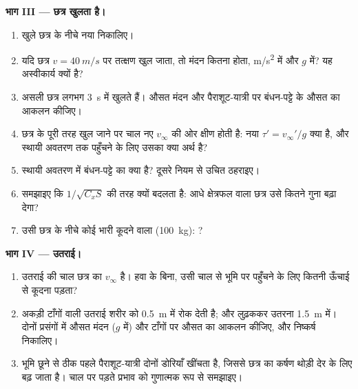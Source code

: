 \begin{problem}
\medskip
\noindent\textbf{भाग III --- छत्र खुलता है।}
\begin{enumerate}[resume]
  \item खुले छत्र के नीचे नया  निकालिए।
  \item यदि छत्र $v = \qty{40}{m/s}$ पर तत्क्षण खुल जाता, तो मंदन कितना
        होता, \unit{m/s^2} में और $g$ में? यह अस्वीकार्य क्यों है?
  \item असली छत्र लगभग \qty{3}{s} में खुलते हैं। औसत मंदन और
        पैराशूट-यात्री पर बंधन-पट्टे के औसत  का आकलन कीजिए।
  \item छत्र के पूरी तरह खुल जाने पर चाल नए $v_\infty$ की ओर क्षीण होती है:
        नया  $\tau' = v_\infty'/g$ क्या है, और स्थायी अवतरण तक
        पहुँचने के लिए उसका क्या अर्थ है?
  \item स्थायी अवतरण में बंधन-पट्टे का  क्या है? दूसरे नियम से उचित
        ठहराइए।
  \item समझाइए कि  $1/\sqrt{C_xS}$ की तरह क्यों बदलता है: आधे
        क्षेत्रफल वाला छत्र उसे कितने गुना बढ़ा देगा?
  \item उसी छत्र के नीचे कोई भारी कूदने वाला (\qty{100}{kg}): ?
\end{enumerate}

\medskip
\noindent\textbf{भाग IV --- उतराई।}
\begin{enumerate}[resume]
  \item उतराई की चाल छत्र का $v_\infty$ है। हवा के बिना, उसी चाल से भूमि
        पर पहुँचने के लिए कितनी ऊँचाई से कूदना पड़ता?
  \item अकड़ी टाँगों वाली उतराई शरीर को \qty{0.5}{m} में रोक देती है; और
        लुढ़ककर उतरना \qty{1.5}{m} में। दोनों प्रसंगों में औसत मंदन ($g$ में)
        और टाँगों पर औसत  का आकलन कीजिए, और निष्कर्ष निकालिए।
  \item भूमि छूने से ठीक पहले पैराशूट-यात्री दोनों डोरियाँ खींचता है, जिससे
        छत्र का कर्षण थोड़ी देर के लिए बढ़ जाता है। चाल पर पड़ते प्रभाव को
        गुणात्मक रूप से समझाइए।
\end{enumerate}


\end{problem}
